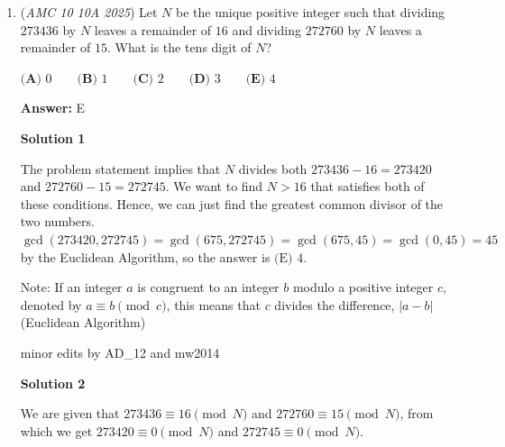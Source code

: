 \begin{enumerate}
 $\frac{1}{27} \cdot 3 \cdot 3 + \frac{1}{27} \cdot 18 \cdot 2 + \frac{1}{27} \cdot 6 \cdot 1 = \frac{1}{3} + \frac{4}{3} + \frac{2}{9} = \frac{5}{3} + \frac{2}{9} = \frac{15}{9} + \frac{2}{9} = \frac{17}{9}$ so the answer is $D$.

 



\textbf{Solution 8 (Cheese)}

(Use if you don't know how expected value works).

 Since we know that there has to be at least $1$ coin in the jar with the most coins, we can instantly rule out answer choice $C$, as $5/8 < 1$. We also know $E$ can't be the answer, as there are more cases to get $1$ as the most rather than $3$. Since we also know there a majority of cases of $2$, the answer will lean towards $2$, giving us answer choice $D$.~mugim

 


	\item (\textit{AMC 10 10A 2025}) Let $N$ be the unique positive integer such that dividing $273436$ by $N$ leaves a remainder of $16$ and dividing $272760$ by $N$ leaves a remainder of $15$. What is the tens digit of $N$?


 $\textbf{(A) } 0 \qquad\textbf{(B) } 1 \qquad\textbf{(C) } 2 \qquad\textbf{(D) } 3 \qquad\textbf{(E) } 4$

 \textbf{Answer: }E



\textbf{Solution 1}

The problem statement implies that $N$ divides both $273436-16=273420$ and $272760-15=272745$. We want to find $N > 16$ that satisfies both of these conditions. Hence, we can just find the greatest common divisor of the two numbers. $\gcd(273420,272745)=\gcd(675,272745)=\gcd(675,45)=\gcd(0,45)=45$ by the Euclidean Algorithm, so the answer is $\boxed{\text{(E) }4}.$

 Note: If an integer $a$ is congruent to an integer $b$ modulo a positive integer $c$, denoted by $a \equiv b \pmod{c}$, this means that $c$ divides the difference, $|a-b|$ (Euclidean Algorithm)

 minor edits by AD\_12 and mw2014

 



\textbf{Solution 2}

We are given that $273436 \equiv 16 \pmod N$ and $272760 \equiv 15 \pmod N$, from which we get $273420 \equiv 0 \pmod N$ and $272745 \equiv 0 \pmod N$.


\end{enumerate}
